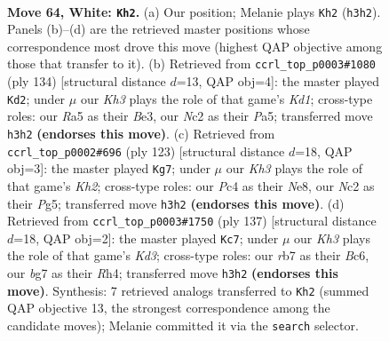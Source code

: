 \documentclass[11pt]{article}
\begin{document}
\clearpage

\begin{figure}[p]\centering
\begin{subfigure}{0.46\textwidth}\centering
\resizebox{\linewidth}{!}{%
\newchessgame
\chessboard[
  setfen={7k/1r4b1/3R4/R7/2P5/7K/2N5/8 w - - 48 64},
  showmover=false,
  pgfstyle=straightmove, color=movearrow, markmove={h3-h2}
]}
\caption{}
\end{subfigure}\hfill
\begin{subfigure}{0.46\textwidth}\centering
\resizebox{\linewidth}{!}{%
\newchessgame
\chessboard[
  setfen={k1r5/1b6/6R1/P7/8/4B3/8/3K4 w - - 19 68},
  showmover=false,
  pgfstyle=straightmove, color=movearrow, markmove={d1-d2}
]}
\caption{}
\end{subfigure}
\\[4pt]
\begin{subfigure}{0.46\textwidth}\centering
\resizebox{\linewidth}{!}{%
\newchessgame
\chessboard[
  setfen={4n3/7k/8/6p1/4K3/5B2/7P/8 b - - 3 62},
  showmover=false,
  pgfstyle=straightmove, color=movearrow, markmove={h7-g7}
]}
\caption{}
\end{subfigure}\hfill
\begin{subfigure}{0.46\textwidth}\centering
\resizebox{\linewidth}{!}{%
\newchessgame
\chessboard[
  setfen={1R6/8/P1bk4/8/7r/KB6/8/8 b - - 2 69},
  showmover=false,
  pgfstyle=straightmove, color=movearrow, markmove={d6-c7}
]}
\caption{}
\end{subfigure}
\caption{\textbf{Move 64, White: \texttt{Kh2}.} (a) Our position; Melanie plays \texttt{Kh2} (\texttt{h3h2}). Panels (b)--(d) are the retrieved master positions whose correspondence most drove this move (highest QAP objective among those that transfer to it). (b) Retrieved from \texttt{ccrl\_top\_p0003\#1080} (ply 134) [structural distance $d$=13, QAP obj=4]: the master played \texttt{Kd2}; under $\mu$ our \emph{Kh3} plays the role of that game's \emph{Kd1}; cross-type roles: our \emph{R}a5 as their \emph{B}e3, our \emph{N}c2 as their \emph{P}a5; transferred move \texttt{h3h2} \textbf{(endorses this move)}. (c) Retrieved from \texttt{ccrl\_top\_p0002\#696} (ply 123) [structural distance $d$=18, QAP obj=3]: the master played \texttt{Kg7}; under $\mu$ our \emph{Kh3} plays the role of that game's \emph{Kh2}; cross-type roles: our \emph{P}c4 as their \emph{N}e8, our \emph{N}c2 as their \emph{P}g5; transferred move \texttt{h3h2} \textbf{(endorses this move)}. (d) Retrieved from \texttt{ccrl\_top\_p0003\#1750} (ply 137) [structural distance $d$=18, QAP obj=2]: the master played \texttt{Kc7}; under $\mu$ our \emph{Kh3} plays the role of that game's \emph{Kd3}; cross-type roles: our \emph{r}b7 as their \emph{B}c6, our \emph{b}g7 as their \emph{R}h4; transferred move \texttt{h3h2} \textbf{(endorses this move)}. Synthesis: 7 retrieved analogs transferred to \texttt{Kh2} (summed QAP objective 13, the strongest correspondence among the candidate moves); Melanie committed it via the \texttt{search} selector.}
\label{fig:thought-m126}
\end{figure}
\end{document}
